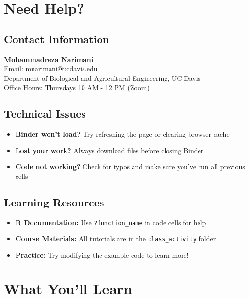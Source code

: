 \documentclass[11pt,a4paper]{article}
\begin{document}
\section{Need Help?}

\subsection{Contact Information}

\begin{infobox}
\textbf{Mohammadreza Narimani}\\
Email: mnarimani@ucdavis.edu\\
Department of Biological and Agricultural Engineering, UC Davis\\
Office Hours: Thursdays 10 AM - 12 PM (Zoom)
\end{infobox}

\subsection{Technical Issues}

\begin{itemize}
    \item \textbf{Binder won't load?} Try refreshing the page or clearing browser cache
    \item \textbf{Lost your work?} Always download files before closing Binder
    \item \textbf{Code not working?} Check for typos and make sure you've run all previous cells
\end{itemize}

\subsection{Learning Resources}

\begin{itemize}
    \item \textbf{R Documentation:} Use \texttt{?function\_name} in code cells for help
    \item \textbf{Course Materials:} All tutorials are in the \texttt{class\_activity} folder
    \item \textbf{Practice:} Try modifying the example code to learn more!
\end{itemize}

\section{What You'll Learn}
\end{document}
